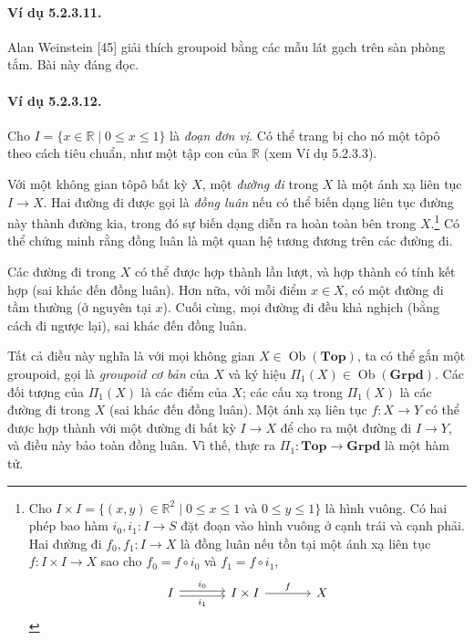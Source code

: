\paragraph{Ví dụ 5.2.3.11.} Alan Weinstein [45] giải thích groupoid bằng các mẫu lát gạch trên sàn phòng tắm. Bài này đáng đọc.
\paragraph{Ví dụ 5.2.3.12.} Cho $I=\{x\in\mathbb R\mid0\leq x\leq1\}$ là \emph{đoạn đơn vị}. Có thể trang bị cho nó một tôpô theo cách tiêu chuẩn, như một tập con của $\mathbb R$ (xem Ví dụ 5.2.3.3).

Với một không gian tôpô bất kỳ $X$, một \emph{đường đi} trong $X$ là một ánh xạ liên tục $I\to X$. Hai đường đi được gọi là \emph{đồng luân} nếu có thể biến dạng liên tục đường này thành đường kia, trong đó sự biến dạng
diễn ra hoàn toàn bên trong $X$.\footnote{Cho $I\times I=\{(x,y)\in\mathbb R^2\mid0\leq x\leq1\text{ và }0\leq y\leq1\}$ là hình vuông. Có hai phép bao hàm $i_0,i_1:I\to S$ đặt đoạn vào hình vuông ở cạnh trái và cạnh phải. Hai đường đi $f_0,f_1:I\to X$ là đồng luân nếu tồn tại một ánh xạ liên tục $f:I\times I\to X$ sao cho $f_0=f\circ i_0$ và $f_1=f\circ i_1$,\[\begin{tikzcd}[ampersand replacement=\&,column sep=large]I\arrow[r,shift left=2pt,"i_0"]\arrow[r,shift right=2pt,"i_1"']\&I\times I\arrow[r,"f"]\&X\end{tikzcd}\]} Có thể chứng minh rằng đồng luân là một quan hệ tương đương trên các đường đi.

Các đường đi trong $X$ có thể được hợp thành lần lượt, và hợp thành có tính kết hợp (sai khác đến đồng luân). Hơn nữa, với mỗi điểm $x\in X$, có một đường đi tầm thường (ở nguyên tại $x$). Cuối cùng, mọi đường đi đều khả nghịch (bằng cách đi ngược lại), sai khác đến đồng luân.

Tất cả điều này nghĩa là với mọi không gian $X\in\operatorname{Ob}(\mathbf{Top})$, ta có thể gắn một groupoid, gọi là \emph{groupoid cơ bản} của $X$ và ký hiệu $\Pi_1(X)\in\operatorname{Ob}(\mathbf{Grpd})$. Các đối tượng của $\Pi_1(X)$ là các điểm của $X$; các cấu xạ trong $\Pi_1(X)$ là các đường đi trong $X$ (sai khác đến đồng luân). Một ánh xạ liên tục $f:X\to Y$ có thể được hợp thành với một đường đi bất kỳ $I\to X$ để cho ra một đường đi $I\to Y$, và điều này bảo toàn đồng luân. Vì thế, thực ra $\Pi_1:\mathbf{Top}\to\mathbf{Grpd}$ là một hàm tử.
